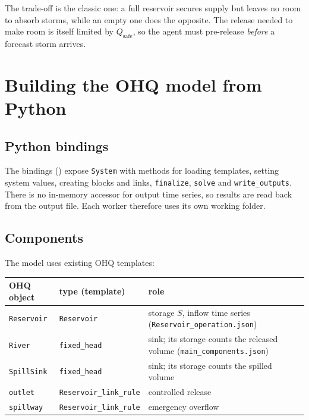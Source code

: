 \documentclass[11pt]{article}
\newcommand{\Qsafe}{Q_{\mathrm{safe}}}
\newcommand{\code}[1]{\texttt{#1}}
\begin{document}
The trade-off is the classic one: a full reservoir secures supply but leaves
no room to absorb storms, while an empty one does the opposite. The release
needed to make room is itself limited by $\Qsafe$, so the agent must
pre-release \emph{before} a forecast storm arrives.

\section{Building the OHQ model from Python}\label{sec:ohqmodel}

\subsection{Python bindings}
The bindings () expose
\code{System} with methods for loading templates, setting system values,
creating blocks and links, \code{finalize}, \code{solve} and
\code{write\_outputs}. There is no in-memory accessor for output time
series, so results are read back from the output file. Each worker
therefore uses its own working folder.

\subsection{Components}
The model uses existing OHQ templates:
\begin{center}
\small
\begin{tabular}{llp{5.2cm}}
\toprule
OHQ object & type (template) & role \\
\midrule
\code{Reservoir} & \code{Reservoir} & storage $S$, inflow time series (\code{Reservoir\_operation.json}) \\
\code{River} & \code{fixed\_head} & sink; its storage counts the released volume (\code{main\_components.json}) \\
\code{SpillSink} & \code{fixed\_head} & sink; its storage counts the spilled volume \\
\code{outlet} & \code{Reservoir\_link\_rule} & controlled release \\
\code{spillway} & \code{Reservoir\_link\_rule} & emergency overflow \\
\bottomrule
\end{tabular}
\end{center}
\end{document}
